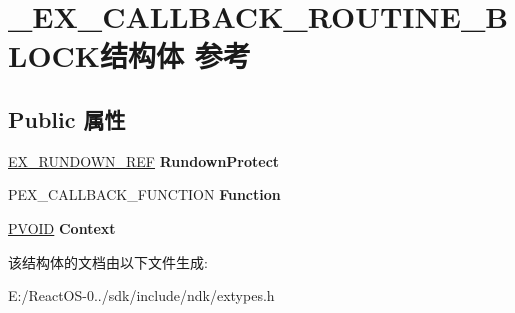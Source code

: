 \hypertarget{struct___e_x___c_a_l_l_b_a_c_k___r_o_u_t_i_n_e___b_l_o_c_k}{}\section{\+\_\+\+E\+X\+\_\+\+C\+A\+L\+L\+B\+A\+C\+K\+\_\+\+R\+O\+U\+T\+I\+N\+E\+\_\+\+B\+L\+O\+C\+K结构体 参考}
\label{struct___e_x___c_a_l_l_b_a_c_k___r_o_u_t_i_n_e___b_l_o_c_k}
\subsection*{Public 属性}
\begin{DoxyCompactItemize}
\item 
\mbox{\label{struct___e_x___c_a_l_l_b_a_c_k___r_o_u_t_i_n_e___b_l_o_c_k_aef38e93f96d4eb5eef88bd989fddae2b}} 
\hyperlink{struct___e_x___r_u_n_d_o_w_n___r_e_f}{E\+X\+\_\+\+R\+U\+N\+D\+O\+W\+N\+\_\+\+R\+EF} {\bfseries Rundown\+Protect}
\item 
\mbox{\label{struct___e_x___c_a_l_l_b_a_c_k___r_o_u_t_i_n_e___b_l_o_c_k_ab820b6de9d9357b6d146d746933dd4ba}} 
P\+E\+X\+\_\+\+C\+A\+L\+L\+B\+A\+C\+K\+\_\+\+F\+U\+N\+C\+T\+I\+ON {\bfseries Function}
\item 
\mbox{\label{struct___e_x___c_a_l_l_b_a_c_k___r_o_u_t_i_n_e___b_l_o_c_k_a997b8298960610a828572645102f0aa7}} 
\hyperlink{interfacevoid}{P\+V\+O\+ID} {\bfseries Context}
\end{DoxyCompactItemize}


该结构体的文档由以下文件生成\+:\begin{DoxyCompactItemize}
\item 
E\+:/\+React\+O\+S-\/0../sdk/include/ndk/extypes.\+h\end{DoxyCompactItemize}
